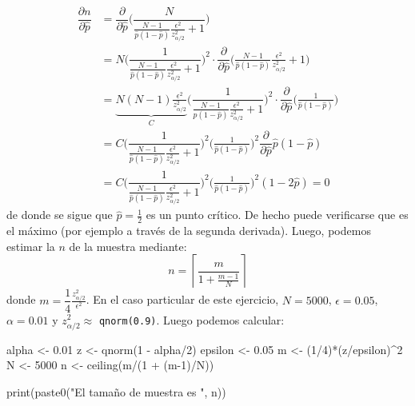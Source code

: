 \documentclass[
]{book}
\newenvironment{Shaded}{\begin{snugshade}}{\end{snugshade}}
\newcommand{\DecValTok}[1]{\textcolor[rgb]{0.00,0.00,0.81}{#1}}
\newcommand{\FloatTok}[1]{\textcolor[rgb]{0.00,0.00,0.81}{#1}}
\newcommand{\FunctionTok}[1]{\textcolor[rgb]{0.00,0.00,0.00}{#1}}
\newcommand{\NormalTok}[1]{#1}
\newcommand{\OtherTok}[1]{\textcolor[rgb]{0.56,0.35,0.01}{#1}}
\newcommand{\SpecialCharTok}[1]{\textcolor[rgb]{0.00,0.00,0.00}{#1}}
\newcommand{\StringTok}[1]{\textcolor[rgb]{0.31,0.60,0.02}{#1}}
\begin{document}
\begin{equation}\nonumber
    \begin{aligned}
    \dfrac{\partial n}{\partial \hat{p}} & = \dfrac{\partial}{\partial \hat{p}} \Bigg(  \dfrac{N}{\frac{N-1}{\hat{p}(1-\hat{p})}\frac{\epsilon^2 }{z_{\alpha/2}^2} + 1} \Bigg) 
    \\ & = N  \Bigg(  \dfrac{1}{\frac{N-1}{\hat{p}(1-\hat{p})}\frac{\epsilon^2 }{z_{\alpha/2}^2} + 1} \Bigg)^2 \cdot \dfrac{\partial}{\partial \hat{p}} \Bigg( \frac{N-1}{\hat{p}(1-\hat{p})}\frac{\epsilon^2 }{z_{\alpha/2}^2} + 1\Bigg)  
    \\ & = \underbrace{N (N-1)\frac{\epsilon^2 }{z_{\alpha/2}^2}}_{C}  \Bigg(  \dfrac{1}{\frac{N-1}{\hat{p}(1-\hat{p})}\frac{\epsilon^2 }{z_{\alpha/2}^2} + 1} \Bigg)^2 \cdot \dfrac{\partial}{\partial \hat{p}} \Bigg( \frac{1}{\hat{p}(1-\hat{p})}\Bigg)  
    \\ & = C \Bigg(  \dfrac{1}{\frac{N-1}{\hat{p}(1-\hat{p})}\frac{\epsilon^2 }{z_{\alpha/2}^2} + 1} \Bigg)^2  \Bigg( \frac{1}{\hat{p}(1-\hat{p})}\Bigg)^2 \dfrac{\partial}{\partial \hat{p}} \hat{p}(1-\hat{p}) 
    \\ & = C \Bigg(  \dfrac{1}{\frac{N-1}{\hat{p}(1-\hat{p})}\frac{\epsilon^2 }{z_{\alpha/2}^2} + 1} \Bigg)^2  \Bigg( \frac{1}{\hat{p}(1-\hat{p})}\Bigg)^2  (1-2\hat{p}) = 0
    \end{aligned}
\end{equation}
de donde se sigue que \(\hat{p} = \frac{1}{2}\) es un punto crítico. De hecho puede verificarse que es el máximo (por ejemplo a través de la segunda derivada). Luego, podemos estimar la \(n\) de la muestra mediante:
\[
n = \left\lceil \dfrac{m}{1 + \frac{m-1}{N}} \right\rceil
\]
donde \(m = \dfrac{1}{4}\frac{z^2_{\alpha/2}}{\epsilon^2}\). En el caso particular de este ejercicio, \(N = 5000\), \(\epsilon = 0.05\), \(\alpha = 0.01\) y \(z^2_{\alpha/2} \approx\) \texttt{qnorm(0.9)}. Luego podemos calcular:

\begin{Shaded}
\begin{Highlighting}[]
\NormalTok{alpha   }\OtherTok{\textless{}{-}} \FloatTok{0.01}
\NormalTok{z       }\OtherTok{\textless{}{-}} \FunctionTok{qnorm}\NormalTok{(}\DecValTok{1} \SpecialCharTok{{-}}\NormalTok{ alpha}\SpecialCharTok{/}\DecValTok{2}\NormalTok{)}
\NormalTok{epsilon }\OtherTok{\textless{}{-}} \FloatTok{0.05}
\NormalTok{m       }\OtherTok{\textless{}{-}}\NormalTok{ (}\DecValTok{1}\SpecialCharTok{/}\DecValTok{4}\NormalTok{)}\SpecialCharTok{*}\NormalTok{(z}\SpecialCharTok{/}\NormalTok{epsilon)}\SpecialCharTok{\^{}}\DecValTok{2}
\NormalTok{N       }\OtherTok{\textless{}{-}} \DecValTok{5000}
\NormalTok{n       }\OtherTok{\textless{}{-}} \FunctionTok{ceiling}\NormalTok{(m}\SpecialCharTok{/}\NormalTok{(}\DecValTok{1} \SpecialCharTok{+}\NormalTok{ (m}\DecValTok{{-}1}\NormalTok{)}\SpecialCharTok{/}\NormalTok{N))}

\FunctionTok{print}\NormalTok{(}\FunctionTok{paste0}\NormalTok{(}\StringTok{"El tamaño de muestra es "}\NormalTok{, n))}
\end{Highlighting}
\end{Shaded}
\end{document}
